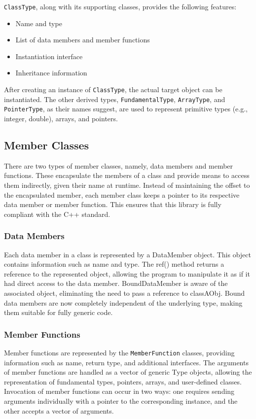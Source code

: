 \documentclass[11pt]{article}
\begin{document}
\begin{multicols*}{2}[\columnsep=1cm]
    \texttt{ClassType}, along with its supporting classes, provides the following features:
        \begin{itemize}
            \item Name and type
            \item List of data members and member functions
            \item Instantiation interface
            \item Inheritance information
        \end{itemize}
    After creating an instance of \texttt{ClassType}, the actual target object can be instantiated.
    The other derived types, \texttt{FundamentalType}, \texttt{ArrayType}, and \texttt{PointerType}, as their names suggest, are used to represent primitive types (e.g., integer, double), arrays, and pointers.

    \subsection{Member Classes}
    There are two types of member classes, namely, data members and member functions. These encapsulate the members of a class and provide means to access them indirectly, given their name at runtime. Instead of maintaining the offset to the encapsulated member, each member class keeps a pointer to its respective data member or member function. This ensures that this library is fully compliant with the C++ standard.
    \subsubsection*{Data Members}
    Each data member in a class is represented by a DataMember object. This object contains information such as name and type.
    The ref() method returns a reference to the represented object, allowing the program to manipulate it as if it had direct access to the data member.
    BoundDataMember is aware of the associated object, eliminating the need to pass a reference to classAObj. Bound data members are now completely independent of the underlying type, making them suitable for fully generic code.
    \subsubsection*{Member Functions}
    Member functions are represented by the \texttt{MemberFunction} classes, providing information such as name, return type, and additional interfaces.
    The arguments of member functions are handled as a vector of generic Type objects, allowing the representation of fundamental types, pointers, arrays, and user-defined classes.
    Invocation of member functions can occur in two ways: one requires sending arguments individually with a pointer to the corresponding instance, and the other accepts a vector of arguments.


\end{multicols*}
\end{document}
